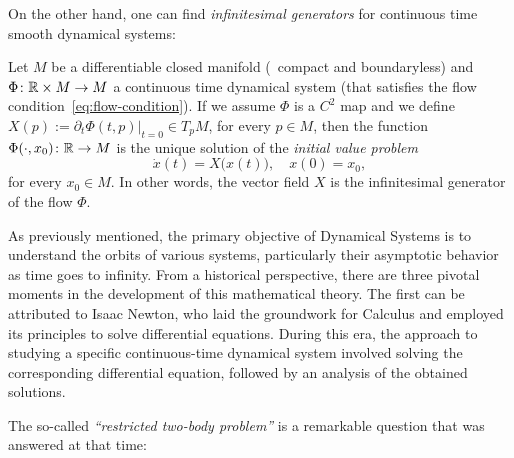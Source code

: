 On the other hand, one can find \emph{infinitesimal generators} for continuous time smooth dynamical systems:

\begin{exercise}
  Let $M$ be a differentiable closed manifold (\ie~compact and boundaryless) and $\Phi\colon\mathbb{R}\times M\to M$ a continuous time dynamical system (that satisfies the flow condition~\ref{eq:flow-condition}). If  we assume $\Phi$ is a $C^{2}$ map and we define $X(p):=\partial_{t}\Phi(t,p)\big|_{t=0}\in T_{p}M$, for every $p\in M$, then the function $\Phi(\cdot,x_{0})\colon\mathbb{R}\to M$ is the unique solution of the \emph{initial value problem}
  \begin{displaymath}
    \dot x(t)=X\big(x(t)\big), \quad x(0)=x_{0},
  \end{displaymath}
  for every $x_{0}\in M$. In other words, the vector field $X$ is the infinitesimal generator of the flow $\Phi$.
\end{exercise}

As previously mentioned, the primary objective of Dynamical Systems is to understand the orbits of various systems, particularly their asymptotic behavior as time goes to infinity. From a historical perspective, there are three pivotal moments in the development of this mathematical theory. The first can be attributed to Isaac Newton, who laid the groundwork for Calculus and employed its principles to solve differential equations. During this era, the approach to studying a specific continuous-time dynamical system involved solving the corresponding differential equation, followed by an analysis of the obtained solutions.

The so-called \emph{``restricted two-body problem''} is a remarkable question that was answered at that time:

